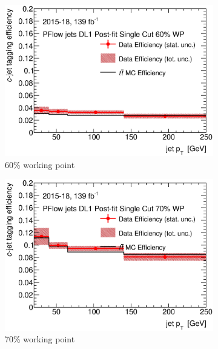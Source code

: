 \newpage

\begin{figure}[H]
	\centering
	\begin{subfigure}[t]{.35\linewidth}
\includegraphics[width=1\textwidth]{FTAG_plots/DL1allPFlowDec/eff60.eps}
\caption{60\% working point}
	\end{subfigure}
\begin{subfigure}[t]{.35\linewidth}
	\includegraphics[width=1\textwidth]{FTAG_plots/DL1allPFlowDec/eff70.eps}
	\caption{70\% working point}
\end{subfigure}
\begin{subfigure}[t]{.35\linewidth}

\end{subfigure}
\end{figure}
